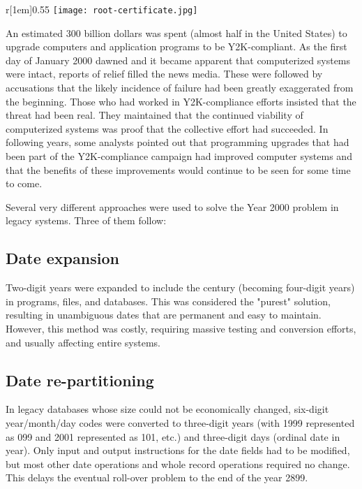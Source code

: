 \documentclass[12pt,a4paper,notitlepage]{article}
\begin{document}
\begin{wrapfigure}[9]{r}[1em]{0.55\textwidth}
	\vspace{-0.5\baselineskip}
	\texttt{[image: root-certificate.jpg]}
\end{wrapfigure}

An estimated 300 billion dollars was spent (almost half in the United States) to upgrade computers and application programs to be Y2K-compliant. As the first day of January 2000 dawned and it became apparent that computerized systems were intact, reports of relief filled the news media. These were followed by accusations that the likely incidence of failure had been greatly exaggerated from the beginning. Those who had worked in Y2K-compliance efforts insisted that the threat had been real. They maintained that the continued viability of computerized systems was proof that the collective effort had succeeded. In following years, some analysts pointed out that programming upgrades that had been part of the Y2K-compliance campaign had improved computer systems and that the benefits of these improvements would continue to be seen for some time to come.

Several very different approaches were used to solve the Year 2000 problem in legacy systems. Three of them follow:

\subsection{Date expansion}
Two-digit years were expanded to include the century (becoming four-digit years) in programs, files, and databases. This was considered the "purest" solution, resulting in unambiguous dates that are permanent and easy to maintain. However, this method was costly, requiring massive testing and conversion efforts, and usually affecting entire systems.

\subsection{Date re-partitioning}
In legacy databases whose size could not be economically changed, six-digit year/month/day codes were converted to three-digit years (with 1999 represented as 099 and 2001 represented as 101, etc.) and three-digit days (ordinal date in year). Only input and output instructions for the date fields had to be modified, but most other date operations and whole record operations required no change. This delays the eventual roll-over problem to the end of the year 2899.
\end{document}
